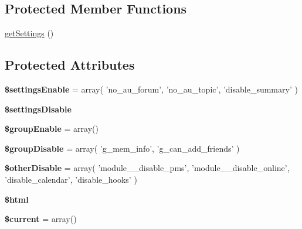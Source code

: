 \subsection*{Protected Member Functions}
\begin{DoxyCompactItemize}
\item 
\hyperlink{classadmin__core__tools__performance_ae7b2b0de7f05bf6b6993996d7475804d}{get\-Settings} ()
\end{DoxyCompactItemize}
\subsection*{Protected Attributes}
\begin{DoxyCompactItemize}
\item 
\hypertarget{classadmin__core__tools__performance_a0e1c6987ea9efcb324402feb83b05a80}{{\bfseries \$settings\-Enable} = array( 'no\-\_\-au\-\_\-forum', 'no\-\_\-au\-\_\-topic', 'disable\-\_\-summary' )}\label{classadmin__core__tools__performance_a0e1c6987ea9efcb324402feb83b05a80}

\item 
{\bfseries \$settings\-Disable}
\item 
\hypertarget{classadmin__core__tools__performance_a6ddad56b2d9af84a35da45e08fb71b02}{{\bfseries \$group\-Enable} = array()}\label{classadmin__core__tools__performance_a6ddad56b2d9af84a35da45e08fb71b02}

\item 
\hypertarget{classadmin__core__tools__performance_a38b25198d79d5139e61b510d75e32259}{{\bfseries \$group\-Disable} = array( 'g\-\_\-mem\-\_\-info', 'g\-\_\-can\-\_\-add\-\_\-friends' )}\label{classadmin__core__tools__performance_a38b25198d79d5139e61b510d75e32259}

\item 
\hypertarget{classadmin__core__tools__performance_a03d773509faabb898cd104b949b5bf75}{{\bfseries \$other\-Disable} = array( 'module\-\_\-\-\_\-disable\-\_\-pms', 'module\-\_\-\-\_\-disable\-\_\-online', 'disable\-\_\-calendar', 'disable\-\_\-hooks' )}\label{classadmin__core__tools__performance_a03d773509faabb898cd104b949b5bf75}

\item 
\hypertarget{classadmin__core__tools__performance_a6f96e7fc92441776c9d1cd3386663b40}{{\bfseries \$html}}\label{classadmin__core__tools__performance_a6f96e7fc92441776c9d1cd3386663b40}

\item 
\hypertarget{classadmin__core__tools__performance_a2c4c58e377f6c66ca38c8ea97666fc5e}{{\bfseries \$current} = array()}\label{classadmin__core__tools__performance_a2c4c58e377f6c66ca38c8ea97666fc5e}

\end{DoxyCompactItemize}


